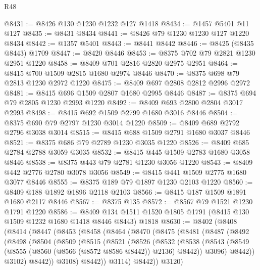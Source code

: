 \begin{lexlean}{R48}
\begin{coremodule}
@8431 := @8426 @130 @1230 @1232 @127 @1418
@8434 := @1457 @5401 @11 @127
@8435 := @8431 @8434
@8441 := @8426 @79 @1230 @1230 @127 @1220 @8434
@8442 := @1357 @5401
@8443 := @8441 @8442
@8446 := @8425 (@8435 @8443) @1709
@8447 := @8420 @8446
@8453 := @8375 @702 @79 @2821 @1230 @2951 @1220
@8458 := @8409 @701 @2816 @2820 @2975 @2951
@8464 := @8415 @700 @1509 @2815 @1680 @2974 @8446
@8470 := @8375 @698 @79 @2813 @1230 @2972 @1220
@8475 := @8409 @697 @2808 @2812 @2996 @2972
@8481 := @8415 @696 @1509 @2807 @1680 @2995 @8446
@8487 := @8375 @694 @79 @2805 @1230 @2993 @1220
@8492 := @8409 @693 @2800 @2804 @3017 @2993
@8498 := @8415 @692 @1509 @2799 @1680 @3016 @8446
@8504 := @8375 @690 @79 @2797 @1230 @3014 @1220
@8509 := @8409 @689 @2792 @2796 @3038 @3014
@8515 := @8415 @688 @1509 @2791 @1680 @3037 @8446
@8521 := @8375 @686 @79 @2789 @1230 @3035 @1220
@8526 := @8409 @685 @2784 @2788 @3059 @3035
@8532 := @8415 @445 @1509 @2783 @1680 @3058 @8446
@8538 := @8375 @443 @79 @2781 @1230 @3056 @1220
@8543 := @8409 @442 @2776 @2780 @3078 @3056
@8549 := @8415 @441 @1509 @2775 @1680 @3077 @8446
@8555 := @8375 @189 @79 @1897 @1230 @2103 @1220
@8560 := @8409 @188 @1892 @1896 @2118 @2103
@8566 := @8415 @187 @1509 @1891 @1680 @2117 @8446
@8567 := @8375 @135
@8572 := @8567 @79 @1521 @1230 @1791 @1220
@8586 := @8409 @134 @1511 @1520 @1805 @1791 (@8415 @130 @1509 @1232 @1680 @1418 @8446 @8443) @1818
@8630 := @8402
    (@8408
      (@8414
        (@8447
          (@8453
            (@8458
              (@8464
                (@8470
                  (@8475
                    (@8481
                      (@8487
                        (@8492
                          (@8498
                            (@8504
                              (@8509
                                (@8515
                                  (@8521
                                    (@8526
                                      (@8532
                                        (@8538
                                          (@8543
                                            (@8549
                                              (@8555
                                                (@8560 (@8566 (@8572 @8586 @8442)) @2136)
                                                @8442))
                                            @3096)
                                          @8442))
                                      @3102)
                                    @8442))
                                @3108)
                              @8442))
                          @3114)
                        @8442))
                    @3120)

\end{coremodule}
\end{lexlean}
